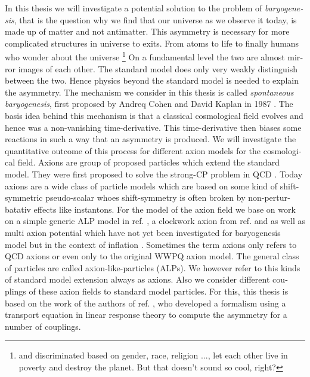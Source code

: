 \documentclass[master,       %
               twoside,        %
               BCOR10mm,       %
               english,ngerman, %
               ]{GAUBM}
\begin{document}
\begin{otherlanguage}{english}
In this thesis we will investigate a potential solution to the problem of \emph{baryogenesis}, that is
the question why we find that our universe as we observe it today, is made up of matter and not antimatter.
This asymmetry is necessary for more complicated structures in universe to exits. From atoms to life to finally humans who wonder about the universe \footnote{and discriminated based on gender, race, religion ..., let each other live in poverty and destroy the planet. But that doesn't sound so cool, right?}
On a fundamental level the two are almost mirror images of each other. The standard model does only very weakly distinguish between the two.
Hence physics beyond the standard model is needed to explain the asymmetry.
The mechanism we consider in this thesis is called \emph{spontaneous baryogenesis}, first proposed by Andreq Cohen and David Kaplan in 1987 \cite{COHEN1987251} \cite{COHEN1988913}.
The basis idea behind this mechanism is that a classical cosmological field evolves and hence was a non-vanishing time-derivative.
This time-derivative then biases some reactions in such a way that an asymmetry is produced.
We will investigate the quantitative outcome of this process for different axion models for the cosmological field.
Axions are group of proposed particles which extend the standard model.
They were first proposed to solve the strong-CP problem in QCD \cite{PQ1} \cite{PQ2} \cite{Weinberg:1977ma} \cite{Wilczek:1977pj}. Today axions are a wide class of particle models which are based on some kind of shift-symmetric pseudo-scalar whoes shift-symmetry is often broken by non-perturbatativ effects like instantons.
For the model of the axion field we base on work on a simple generic ALP model in ref. \cite{Kusenko_2015_Axion_Leptogenesis}, a clockwork axion from ref. \cite{Deformed_potential_Bae_2019} and \cite{general_cont_clockwork_Choi_2018} as well as multi axion potential which have not yet been investigated for baryogenesis model but in the context of inflation \cite{Kim_multi_axions:2004rp}.
Sometimes the term axions only refers to QCD axions or even only to the original WWPQ axion model. The general class of particles are called axion-like-particles (ALPs). We however refer to this kinds of standard model extension always as axions.
Also we consider different couplings of these axion fields to standard model particles. For this, this thesis is based on the work of the authors of ref. \cite{Domcke:2020kcp_Generic_Couplings}, who developed a formalism using a transport equation in linear response theory to compute the asymmetry for a number of couplings.

\end{otherlanguage}
\end{document}
